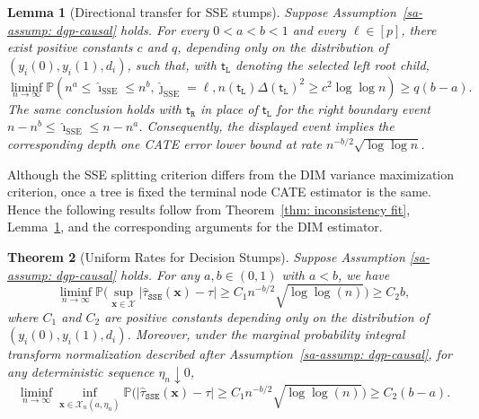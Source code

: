 \documentclass[10pt]{article}
\def\nodet{\mathsf{t}}
\def\bx{\mathbf{x}}
\newtheorem{theorem}{Theorem}%
\newtheorem{lemma}[theorem]{Lemma}
\theoremstyle{definition}
\theoremstyle{remark}
\begin{document}
\begin{lemma}[Directional transfer for SSE stumps]\label{sa-lem:sse-directional-transfer}
Suppose Assumption~\ref{sa-assump: dgp-causal} holds. For every $0<a<b<1$ and every $\ell\in[p]$, there exist positive constants $c$ and $q$, depending only on the distribution of $(y_i(0),y_i(1),d_i)$, such that, with $\nodet_{\mathtt L}$ denoting the selected left root child,
\[
    \liminf_{n\to\infty}
    \mathbb P\!\left(
        n^a\leq \hat{\imath}_{\text{SSE}}\leq n^b,
        \hat{\jmath}_{\text{SSE}}=\ell,
        n(\nodet_{\mathtt L})\Delta(\nodet_{\mathtt L})^2
        \geq
        c^2\log\log n
    \right)
    \geq q(b-a).
\]
The same conclusion holds with $\nodet_{\mathtt R}$ in place of $\nodet_{\mathtt L}$ for the right boundary event $n-n^b\leq \hat{\imath}_{\text{SSE}}\leq n-n^a$. Consequently, the displayed event implies the corresponding depth one CATE error lower bound at rate $n^{-b/2}\sqrt{\log\log n}$.
\end{lemma}

Although the SSE splitting criterion differs from the DIM variance maximization criterion, once a tree is fixed the terminal node CATE estimator is the same. Hence the following results follow from Theorem~\ref{thm: inconsistency fit}, Lemma~\ref{sa-lem:sse-directional-transfer}, and the corresponding arguments for the DIM estimator.



\begin{theorem}[Uniform Rates for Decision Stumps]\label{sa-thm:rates_reg_fit}
    Suppose Assumption \ref{sa-assump: dgp-causal} holds. For any $ a,b \in (0, 1) $ with $ a < b $, we have
    \begin{equation*}
    \liminf_{n\to\infty} \mathbb{P}\Bigg(\sup_{\bx\in\mathcal{X}}|\hat\tau_{\mathtt{SSE}}(\bx) - \tau| \geq C_1 n^{-b/2}\sqrt{\log\log(n)}\Bigg) \geq C_2 b,
    \end{equation*}
    where $C_1$ and $C_2$ are positive constants depending only on the distribution of $(y_i(0),y_i(1),d_i)$. Moreover, under the marginal probability integral transform normalization described after Assumption~\ref{sa-assump: dgp-causal}, for any deterministic sequence $\eta_n\downarrow0$,
    \begin{equation*}
    \liminf_{n\to\infty} \inf_{\bx\in \mathcal{X}_n(a,\eta_n)} \mathbb{P}\Big(|\hat\tau_{\mathtt{SSE}}(\bx) - \tau| \geq C_1 n^{-b/2}\sqrt{\log\log(n)}\Big) \geq C_2 (b-a).
    \end{equation*}
\end{theorem}
\end{document}

